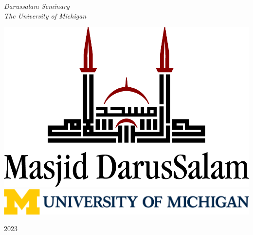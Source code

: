 \documentclass[11pt,twoside]{book}
\begin{document}
\begin{titlepage}
	\vspace{0.5\baselineskip} %
	
	\textit{\textenglish{Darussalam Seminary\\\vspace{3mm}The University of Michigan}} %
	
	\vfill %
	
	
    \includegraphics[scale=0.4]{MasjidLogo}\\
    \includegraphics[scale=0.4]{UMLogo}
	
	\vspace{0.3\baselineskip} %
	
	\textenglish{2023} %
	

\end{titlepage}
\end{document}
